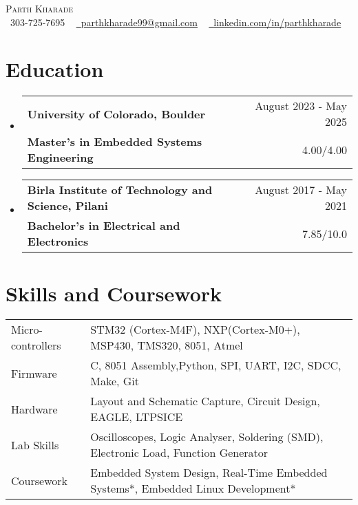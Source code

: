 \documentclass[a4,11pt]{article}
\makeatletter
\newcommand{\resumeSubheading}[4]{
  \vspace{-2pt}\item
    \begin{tabular*}{1.0\textwidth}[t]{l@{\extracolsep{\fill}}r}
       {\large \textbf{#1}} &  {\large #2} \\
      \textbf{#3} & { #4} \\
    \end{tabular*}\vspace{-1pt}
}
\newcommand{\resumeSubHeadingListStart}{\begin{itemize}[leftmargin=0.0in, label={}]}
\newcommand{\resumeSubHeadingListEnd}{\end{itemize}}
\makeatother
\begin{document}
\begin{center}
    {\Huge \scshape Parth Kharade} \\ \vspace{1pt}
    \small \raisebox{-0.1\height}\faPhone\ 303-725-7695 ~ \href{mailto:parthkharade99@gmail.com}{\raisebox{-0.2\height}\faEnvelope\  \underline{parthkharade99@gmail.com}} ~ 
    \href{https://www.linkedin.com/in/parth-k-081287184/}{\raisebox{-0.2\height}\faLinkedin\ \underline{linkedin.com/in/parthkharade}}  ~
    \vspace{-16pt}
\end{center}


\section{Education}
  \resumeSubHeadingListStart
    \resumeSubheading
      {University of Colorado, Boulder}{August 2023 - May 2025}
      {Master's in Embedded Systems Engineering}{4.00/4.00}
      \vspace{-0.1in}
    \resumeSubheading
      {Birla Institute of Technology and Science, Pilani}{August 2017 - May 2021}
      {Bachelor's in Electrical and Electronics}{7.85/10.0}
  \resumeSubHeadingListEnd
 \vspace{-16pt}
 \section{Skills and Coursework}
 \vspace{-4mm}
\begin{table}[!htb]
    \begin{tabular}{ m{3.1cm} | m{16cm} } 
      {Micro-controllers}&{\: STM32 (Cortex-M4F), NXP(Cortex-M0+), MSP430, TMS320, 8051, Atmel} \\
      {Firmware}&{\: C, 8051 Assembly,Python, SPI, UART, I2C, SDCC, Make, Git} \\
      {Hardware}&{\: Layout and Schematic Capture, Circuit Design, EAGLE, LTPSICE} \\
      {Lab Skills}&{\: Oscilloscopes, Logic Analyser, Soldering (SMD), Electronic Load, Function Generator} \\
      {Coursework}&{\: Embedded System Design, Real-Time Embedded Systems*, Embedded Linux Development*} \\
    \end{tabular}
\end{table}
 \vspace{-16pt}
\end{document}
